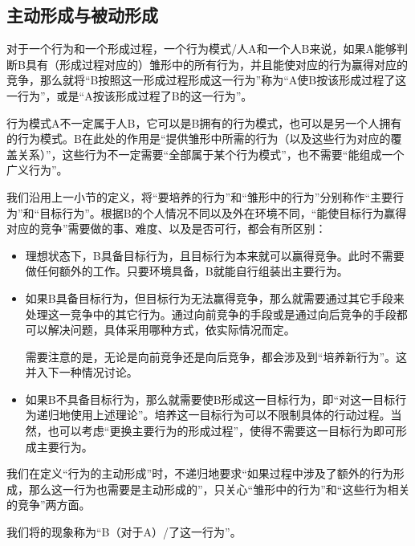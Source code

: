 \subsection{主动形成与被动形成}
对于一个行为和一个形成过程，一个行为模式/人A和一个人B来说，如果A能够判断B具有（形成过程对应的）雏形中的所有行为，并且能使对应的行为赢得对应的竞争，那么就将“B按照这一形成过程形成这一行为”称为“A使B按该形成过程了这一行为”，或是“A按该形成过程了B的这一行为”。
\begin{explain}
行为模式A不一定属于人B，它可以是B拥有的行为模式，也可以是另一个人拥有的行为模式。B在此处的作用是“提供雏形中所需的行为（以及这些行为对应的覆盖关系）”，这些行为不一定需要“全部属于某个行为模式”，也不需要“能组成一个广义行为”。

我们沿用上一小节的定义，将“要培养的行为”和“雏形中的行为”分别称作“主要行为”和“目标行为”。根据B的个人情况不同以及外在环境不同，“能使目标行为赢得对应的竞争”需要做的事、难度、以及是否可行，都会有所区别：
\begin{itemize}
\item 理想状态下，B具备目标行为，且目标行为本来就可以赢得竞争。此时不需要做任何额外的工作。只要环境具备，B就能自行组装出主要行为。
\item 如果B具备目标行为，但目标行为无法赢得竞争，那么就需要通过其它手段来处理这一竞争中的其它行为。通过向前竞争的手段或是通过向后竞争的手段都可以解决问题，具体采用哪种方式，依实际情况而定。

需要注意的是，无论是向前竞争还是向后竞争，都会涉及到“培养新行为”。这并入下一种情况讨论。
\item 如果B不具备目标行为，那么就需要使B形成这一目标行为，即“对这一目标行为递归地使用上述理论”。培养这一目标行为可以不限制具体的行动过程。当然，也可以考虑“更换主要行为的形成过程”，使得不需要这一目标行为即可形成主要行为。
\end{itemize}
\insertparanotes
我们在定义“行为的主动形成”时，不递归地要求“如果过程中涉及了额外的行为形成，那么这一行为也需要是主动形成的”，只关心“雏形中的行为”和“这些行为相关的竞争”两方面。
\end{explain}
我们将的现象称为“B（对于A）/了这一行为”。
